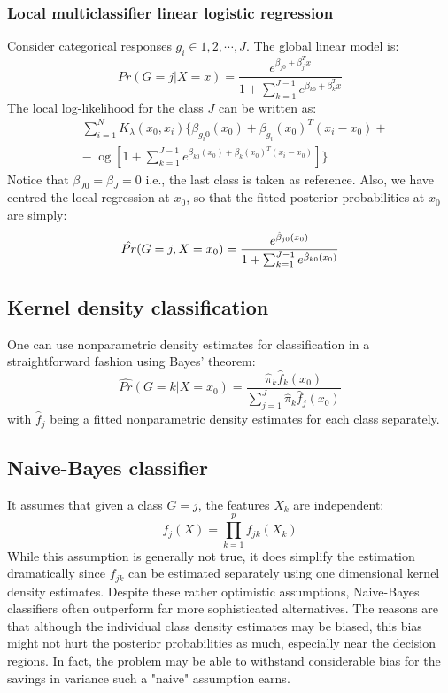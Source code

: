 \subsubsection{Local multiclassifier linear logistic regression}
Consider categorical responses $g_i \in {1,2,\cdots, J}$. The global linear model is:
\begin{equation*}
Pr(G=j|X=x) = \frac{e^{\beta_{j0}+\beta_j^Tx}}{1+\sum_{k=1}^{J-1}e^{\beta_{k0}+\beta_k^Tx}}
\end{equation*}
The local log-likelihood for the class $J$ can be written as:
\begin{equation}
\begin{aligned}
&\sum_{i=1}^N K_\lambda(x_0, x_i) \Bigg\{\beta_{g_i0}(x_0)+ \beta_{g_i}(x_0)^T(x_i-x_0)+\\
& -\log\left[ 1+\sum_{k=1}^{J-1}e^{\beta_{k0}(x_0)+\beta_k(x_0)^T(x_i-x_0)}\right]\Bigg\}
\end{aligned}
\end{equation}
Notice that $\beta_{J0}=\beta_{J}=0$ i.e., the last class is taken as reference. Also, we have centred the local regression at $x_0$, so that the fitted posterior probabilities at $x_0$ are simply:
\begin{equation}
\hat{Pr}\br{G=j, X=x_0} = \frac{e^{\hat{\beta}_{j0}(x_0)}}{1+\sum_{k=1}^{J-1}e^{\hat{\beta}_{k0}(x_0)}}
\end{equation}

\subsection{Kernel density classification}
One can use nonparametric density estimates for classification in a straightforward fashion using Bayes' theorem:
\begin{equation}
\hat{Pr}(G=k|X=x_0) = \frac{\hat{\pi}_k \hat{f}_k(x_0)}{\sum_{j=1}^J\hat{\pi}_k \hat{f}_j(x_0)}
\end{equation}
with $\hat{f}_j$ being a fitted nonparametric density estimates for each class separately.

\subsection{Naive-Bayes classifier}
It assumes that given a class $G=j$, the features $X_k$ are independent:
\begin{equation}
f_j(X) = \prod_{k=1}^p f_{jk}(X_k)
\end{equation}
While this assumption is generally not true, it does simplify the estimation
dramatically since $f_{jk}$ can be estimated separately using one dimensional kernel density estimates.
Despite these rather optimistic assumptions, Naive-Bayes classifiers often outperform far more sophisticated alternatives. The reasons are that although the individual class density estimates may be biased, this bias might not hurt the posterior probabilities as much, especially near the decision regions. In fact, the problem may be able to withstand considerable bias for the savings in variance such a "naive" assumption earns.


